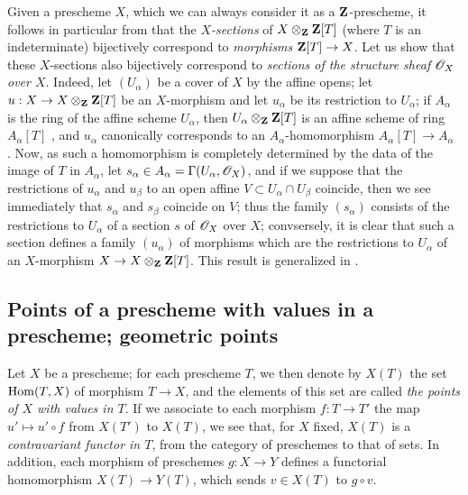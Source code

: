 \begin{env}[3.3.15]
\label{1.3.3.15}
Given a prescheme $X$, which we can always consider it as a $\mathbf{Z}$-prescheme,
it follows in particular from  that the \emph{$X$-sections} of
$X\otimes_\mathbf{Z}\mathbf{Z}[T]$ (where $T$ is an indeterminate) bijectively
correspond to \emph{morphisms} $\bb{Z}[T]\to X$. Let us show that these
$X$-sections also bijectively correspond to \emph{sections of the structure
sheaf $\mathscr{O}_X$ over $X$}. Indeed, let $(U_\alpha)$ be a cover of $X$ by the
affine opens; let $u:X\to X\otimes_\bb{Z}\bb{Z}[T]$ be an $X$-morphism and let
$u_\alpha$ be its restriction to $U_\alpha$; if $A_\alpha$ is the ring of the
affine scheme $U_\alpha$, then $U_\alpha\otimes_\mathbf{Z}\mathbf{Z}[T]$ is an affine
scheme of ring $A_\alpha[T]$ , and $u_\alpha$ canonically
corresponds to an $A_\alpha$-homomorphism $A_\alpha[T]\to A_\alpha$
. Now, as such a homomorphism is completely determined by the
data of the image of $T$ in $A_\alpha$, let
$s_\alpha\in A_\alpha=\Gamma(U_\alpha,\mathscr{O}_X)$, and if we suppose that the
restrictions of $u_\alpha$ and $u_\beta$ to an open affine
$V\subset U_\alpha\cap U_\beta$ coincide, then we see immediately that
$s_\alpha$ and $s_\beta$ coincide on $V$; thus the family $(s_\alpha)$ consists
of the restrictions to $U_\alpha$ of a section $s$ of $\mathscr{O}_X$ over $X$;
convsersely, it is clear that such a section defines a family $(u_\alpha)$ of
morphisms which are the restrictions to $U_\alpha$ of an $X$-morphism
$X\to X\otimes_\bb{Z}\bb{Z}[T]$. This result is generalized in
.
\end{env}

\subsection{Points of a prescheme with values in a prescheme; geometric points}
\label{subsection-prescheme-geometric-points}

\begin{env}[3.4.1]
\label{1.3.4.1}
Let $X$ be a prescheme; for each prescheme $T$, we then denote by $X(T)$ the set
${\mathop{\mathrm{Hom}}\nolimits}(T,X)$ of morphism $T\to X$, and the elements of this set are called
\emph{the points of $X$ with values in $T$}. If we associate to each morphism
$f:T\to T'$ the map $u'\mapsto u'\circ f$ from $X(T')$ to $X(T)$, we see that,
for $X$ fixed, $X(T)$ is a \emph{contravariant functor in $T$}, from the
category of preschemes to that of sets. In addition, each morphism of preschemes
$g:X\to Y$ defines a functorial homomorphism $X(T)\to Y(T)$, which sends
$v\in X(T)$ to $g\circ v$.
\end{env}

